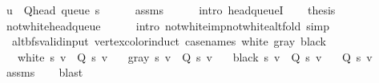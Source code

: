 \begin{isabellebody}
\ {\isachardoublequoteopen}u\ {\isacharequal}{\kern0pt}\ Q{\isacharunderscore}{\kern0pt}head\ {\isacharparenleft}{\kern0pt}queue\ s{\isacharparenright}{\kern0pt}{\isachardoublequoteclose}\isanewline
\ \ \ \ \isamarkupfalse%
\ assms\isanewline
\ \ \ \ \isamarkupfalse%
\ {\isacharparenleft}{\kern0pt}intro\ head{\isacharunderscore}{\kern0pt}queueI{\isacharparenright}{\kern0pt}\isanewline
\ \ \isamarkupfalse%
\ {\isacharquery}{\kern0pt}thesis\isanewline
\ \ \ \ \isamarkupfalse%
\ not{\isacharunderscore}{\kern0pt}white{\isacharunderscore}{\kern0pt}head{\isacharunderscore}{\kern0pt}queue\isanewline
\ \ \ \ \isamarkupfalse%
\ {\isacharparenleft}{\kern0pt}intro\ not{\isacharunderscore}{\kern0pt}white{\isacharunderscore}{\kern0pt}imp{\isacharunderscore}{\kern0pt}not{\isacharunderscore}{\kern0pt}white{\isacharunderscore}{\kern0pt}alt{\isacharunderscore}{\kern0pt}fold{\isacharparenright}{\kern0pt}\ simp\isanewline
{}\isamarkupfalse%
%
\endisatagproof
{\isafoldproof}%
%
\isadelimproof
\isanewline
%
\endisadelimproof
%
\isadeliminvisible
\isanewline
%
\endisadeliminvisible
%
\isataginvisible
{}\isamarkupfalse%
\ {\isacharparenleft}{\kern0pt}\ alt{\isacharunderscore}{\kern0pt}bfs{\isacharunderscore}{\kern0pt}valid{\isacharunderscore}{\kern0pt}input{\isacharparenright}{\kern0pt}\ vertex{\isacharunderscore}{\kern0pt}color{\isacharunderscore}{\kern0pt}induct\ {\isacharbrackleft}{\kern0pt}case{\isacharunderscore}{\kern0pt}names\ white\ gray\ black{\isacharbrackright}{\kern0pt}{\isacharcolon}{\kern0pt}\isanewline
\ \ \ {\isachardoublequoteopen}white\ s\ v\ {\isasymLongrightarrow}\ Q{\isacharprime}{\kern0pt}\ s\ v{\isachardoublequoteclose}\isanewline
\ \ \ {\isachardoublequoteopen}gray\ s\ v\ {\isasymLongrightarrow}\ Q{\isacharprime}{\kern0pt}\ s\ v{\isachardoublequoteclose}\isanewline
\ \ \ {\isachardoublequoteopen}black\ s\ v\ {\isasymLongrightarrow}\ Q{\isacharprime}{\kern0pt}\ s\ v{\isachardoublequoteclose}\isanewline
\ \ \ {\isachardoublequoteopen}Q{\isacharprime}{\kern0pt}\ s\ v{\isachardoublequoteclose}%
\endisataginvisible
{\isafoldinvisible}%
%
\isadeliminvisible
\isanewline
%
\endisadeliminvisible
%
\isadelimproof
\ \ %
\endisadelimproof
%
\isatagproof
{}\isamarkupfalse%
\ assms\isanewline
\ \ \isamarkupfalse%
\ blast%
\endisatagproof
{\isafoldproof}%
%
\isadelimproof
\isanewline
%
\endisadelimproof
%
\isadeliminvisible
\isanewline

\end{isabellebody}
